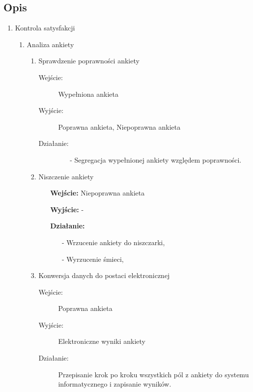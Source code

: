 \documentclass[a4paper, 11pt]{article}
\begin{document}
	
	


	\subsection{Opis}
	\begin{enumerate}[label*=\arabic*.]
		\item Kontrola satysfakcji
		\begin{enumerate}[label*=\arabic*.]
			\item Analiza ankiety
			\begin{enumerate}[label*=\arabic*.]
				\item Sprawdzenie poprawności ankiety
				\begin{description}
					\item[Wejście:]	Wypełniona ankieta 
					\item[Wyjście:]	Poprawna ankieta, Niepoprawna ankieta
					\item[Działanie:] 
					\begin{itemize}
						\item[-] Segregacja wypełnionej ankiety względem poprawności.
					\end{itemize}										
				\end{description}				
				\item Niszczenie ankiety
				\begin{itemize}			
					\item[\textbf{Wejście:}] Niepoprawna ankieta
					\item[\textbf{Wyjście:}] -
					\item[\textbf{Działanie:}]
					\begin{itemize}
						\item[-] Wrzucenie ankiety do niszczarki,
						\item[-] Wyrzucenie śmieci,
					\end{itemize}										
				\end{itemize}				
				\item Konwersja danych do postaci elektronicznej
				\begin{description}
					\item[Wejście:] Poprawna ankieta
					\item[Wyjście:] Elektroniczne wyniki ankiety
					\item[Działanie:] Przepisanie krok po kroku wszystkich pól z ankiety do systemu informatycznego i zapisanie wyników.
				\end{description}	
			\end{enumerate}

\end{enumerate}
\end{enumerate}
\end{document}
